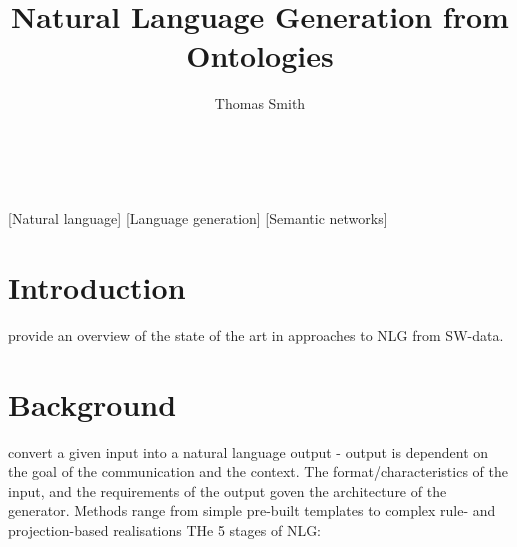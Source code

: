 \documentclass{acm_proc_article-sp}
\begin{document}
\title{Natural Language Generation from Ontologies}


\author{
\alignauthor
Thomas Smith\\
       \\
       \\
}

\maketitle
\begin{abstract}
\end{abstract}

[Natural language]
[Language generation]
[Semantic networks]




\section{Introduction}
provide an overview of the state of the art in approaches to NLG from SW-data.
\section{Background}
convert a given input into a natural language output - output is dependent on the goal of the communication and the context. The format/characteristics of the input, and the requirements of the output goven the architecture of the generator. Methods range from simple pre-built templates to complex rule- and projection-based realisations
THe 5 stages of NLG:
\end{document}
